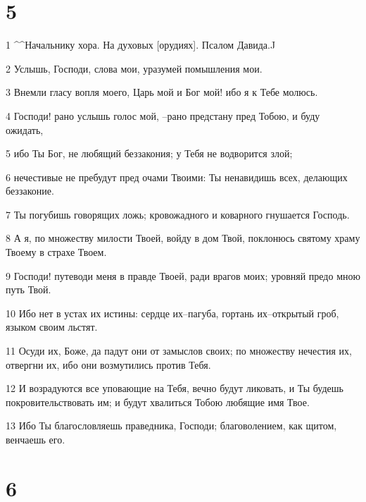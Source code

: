 \chapter{5}

\par 1 ^^Начальнику хора. На духовых [орудиях]. Псалом Давида.^^
\par 2 Услышь, Господи, слова мои, уразумей помышления мои.
\par 3 Внемли гласу вопля моего, Царь мой и Бог мой! ибо я к Тебе молюсь.
\par 4 Господи! рано услышь голос мой, --рано предстану пред Тобою, и буду ожидать,
\par 5 ибо Ты Бог, не любящий беззакония; у Тебя не водворится злой;
\par 6 нечестивые не пребудут пред очами Твоими: Ты ненавидишь всех, делающих беззаконие.
\par 7 Ты погубишь говорящих ложь; кровожадного и коварного гнушается Господь.
\par 8 А я, по множеству милости Твоей, войду в дом Твой, поклонюсь святому храму Твоему в страхе Твоем.
\par 9 Господи! путеводи меня в правде Твоей, ради врагов моих; уровняй предо мною путь Твой.
\par 10 Ибо нет в устах их истины: сердце их--пагуба, гортань их--открытый гроб, языком своим льстят.
\par 11 Осуди их, Боже, да падут они от замыслов своих; по множеству нечестия их, отвергни их, ибо они возмутились против Тебя.
\par 12 И возрадуются все уповающие на Тебя, вечно будут ликовать, и Ты будешь покровительствовать им; и будут хвалиться Тобою любящие имя Твое.
\par 13 Ибо Ты благословляешь праведника, Господи; благоволением, как щитом, венчаешь его.

\chapter{6}


